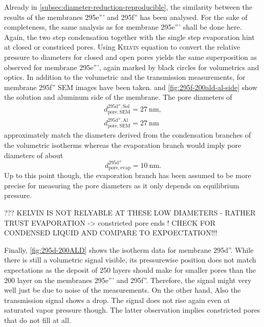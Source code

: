 \documentclass[../thesis.tex]{subfiles}
\begin{document}
            Already in \cref{subsec:diameter-reduction-reproducible}, the similarity between the results of the membranes 295e''' and 295f'' has been analysed. For the sake of completeness, the same analysis as for membrane 295e''' shall be done here. Again, the two step condensation together with the single step evaporation hint at closed or constriced pores. Using \textsc{Kelvin} equation to convert the relative pressure to diameters for closed and open pores yields the same superposition as observed for membrane 295e''', again marked by black circles for volumetrics and optics. In addition to the volumetric and the transmission measurements, for membrane 295f'' SEM images have been taken.  and \cref{fig:295f-200ald-al-side} show the solution and aluminum side of the membrane. The pore diameters of
            \begin{equation}
              \begin{split}
                  d_\mathrm{pore,SEM}^\mathrm{295d'',Sol}=\SI{27}{\nano\meter}, \\
                  d_\mathrm{pore,SEM}^\mathrm{295d'',Al}=\SI{27}{\nano\meter}
              \end{split}
            \end{equation}
            approximately match the diameters derived from the condensation branches of the volumetric isotherms whereas the evaporation branch would imply pore diameters of about
            \begin{equation}
              d_\mathrm{pore,evap}^\mathrm{295d''}=\SI{10}{\nano\meter}.
            \end{equation}
            Up to this point though, the evaporation branch has been assumed to be more precise for measuring the pore diameters as it only depends on equilibrium pressure.

            ??? KELVIN IS NOT RELYABLE AT THESE LOW DIAMETERS - RATHER TRUST EVAPORATION -> constricted pore ends ! CHECK FOR CONDENSED LIQUID AND COMPARE TO EXPOECTATION!!!
            \medskip

            Finally, \cref{fig:295d-200ALD} shows the isotherm data for membrane 295d''. While there is still a volumetric signal visible, its pressurewise position does not match expectations as the deposit of 250 layers should make for smaller pores than the 200 layer on the membranes 295e''' and 295f''. Therefore, the signal might very well just be due to noise of the measurements. On the other hand, Also the transmission signal shows a drop. The signal does not rise again even at saturated vapor pressure though. The latter observation implies constricted pores that do not fill at all.
\end{document}
